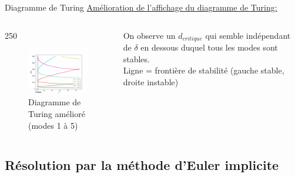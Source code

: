 \documentclass{beamer}
\begin{document}
\begin{frame}{Diagramme de Turing}
    \underline{Amélioration de l'affichage du diagramme de Turing:}
    
    \begin{columns}

    \begin{column}{250}
    \begin{figure}
    \includegraphics[width=220]{diagrammes_turing_bis_avec_d_crit.png}
    \caption{\label{diagramme_turing_2}{Diagramme de Turing amélioré (modes 1 à 5)}}
    \end{figure}
    \end{column}
    
    \begin{column}{2.7cm}
    On observe un $d_{critique}$ qui semble indépendant de $\delta$ en dessous duquel tous les modes sont stables. \\
    Ligne = frontière de stabilité (gauche stable, droite instable)
    
    \end{column}
    \end{columns}
    
    
\end{frame}




\subsection{Résolution par la méthode d’Euler implicite}
\end{document}

